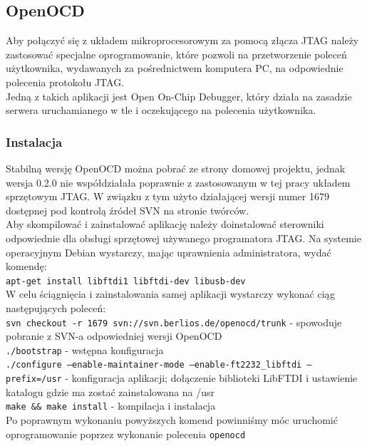 \documentclass[a4paper,12pt]{book}
\begin{document}
		
		
		
			\subsection{OpenOCD}
				Aby połączyć się z układem mikroprocesorowym za pomocą złącza JTAG należy zastosować specjalne oprogramowanie, które pozwoli na przetworzenie poleceń użytkownika, wydawanych za pośrednictwem komputera PC, na odpowiednie polecenia protokołu JTAG.\\
				Jedną z takich aplikacji jest Open On-Chip Debugger\cite{openocd}, który działa na zasadzie serwera uruchamianego w tle i oczekującego na polecenia użytkownika.
				\subsubsection{Instalacja}
					Stabilną wersję OpenOCD można pobrać ze strony domowej projektu, jednak wersja 0.2.0 nie współdziałała poprawnie z zastosowanym w tej pracy układem sprzętowym JTAG. W związku z tym użyto działającej wersji numer 1679 dostępnej pod kontrolą źródeł SVN na stronie twórców.\\
					Aby skompilować i zainstalować aplikację należy doinstalować sterowniki odpowiednie dla obsługi sprzętowej używanego programatora JTAG. Na systemie operacyjnym Debian wystarczy, mając uprawnienia administratora, wydać komendę:\\
					\texttt{apt-get install libftdi1 libftdi-dev libusb-dev}\\
					W celu ściągnięcia i zainstalowania samej aplikacji wystarczy wykonać ciąg następujących poleceń:\\
					\texttt{svn checkout -r 1679 svn://svn.berlios.de/openocd/trunk} - spowoduje pobranie z SVN-a odpowiedniej wersji OpenOCD\\
					\texttt{./bootstrap} - wstępna konfiguracja\\
					\texttt{./configure --enable-maintainer-mode --enable-ft2232\_libftdi --prefix=/usr} - konfiguracja aplikacji; dołączenie biblioteki LibFTDI i ustawienie katalogu gdzie ma zostać zainstalowana na /usr\\
					\texttt{make \&\& make install} - kompilacja i instalacja\\
					Po poprawnym wykonaniu powyższych komend powinniśmy móc uruchomić oprogramowanie poprzez wykonanie polecenia \texttt{openocd}
					
\end{document}
